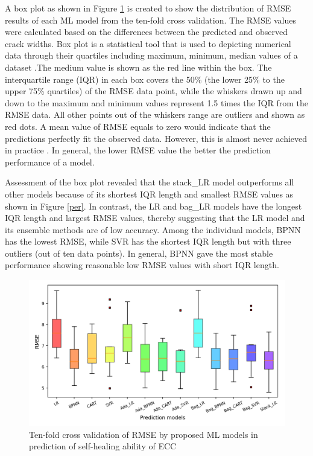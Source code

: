\documentclass[11pt]{article}
\begin{document}
	A box plot as shown in Figure \ref{bar} is created to show the distribution of RMSE results of each ML model from the ten-fold cross validation. The RMSE values were calculated based on the differences between the predicted and observed crack widths. Box plot is a statistical tool that is used to depicting numerical data through their quartiles including maximum, minimum, median values of a dataset \cite{taffese2015caprm,olalusi2020machine}.The medium value is shown as the red line within the box. The interquartile range (IQR) in each box covers the 50\% (the lower 25\% to the upper 75\% quartiles) of the RMSE data point, while the whiskers drawn up and down to the maximum and minimum values represent 1.5 times the IQR from the RMSE data. All other points out of the whiskers range are outliers and shown as red dots. A mean value of RMSE equals to zero would indicate that the predictions perfectly fit the observed data. However, this is almost never achieved in practice \cite{wikiRMSE}. In general, the lower RMSE value the  better the prediction performance of a model. 
   	
	
	Assessment of the box plot revealed that the stack\_LR model outperforms all other models because of its shortest IQR length and smallest RMSE values as shown in Figure \ref{per}. In contrast, the LR and bag\_LR models have the longest IQR length and largest RMSE values, thereby suggesting that the LR model and its ensemble methods are of low accuracy. Among the individual models, BPNN has the lowest RMSE, while SVR has the shortest IQR length but with three outliers (out of ten data points). In general, BPNN gave the most stable performance showing reasonable low RMSE values with short IQR length. 
	
	
	
	\begin{figure}[!h]
		\centering
		\includegraphics[width=\textwidth]{boxRMSE.png}
		\caption{Ten-fold cross validation of RMSE by proposed ML models in prediction of self-healing ability of ECC}
		\label{bar}
	\end{figure}
	
\end{document}
